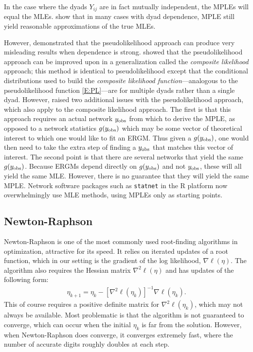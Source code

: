 In the case where the dyads $Y_{ij}$ are in fact mutually independent, the MPLEs will equal the MLEs.  
\citet{Strauss:1990} show that in 
many cases with dyad dependence, MPLE still yield reasonable approximations of the 
true MLEs.  

However, \citet*{Geyer:1992, Snijders:2002, Duijn:2009} demonstrated that 
the pseudolikelihood approach can produce very misleading results 
when dependence is strong.  
\citet*{Composite} showed that the pseudolikelihood approach can be 
improved upon in a generalization 
called the \emph{composite likelihood} approach; this method is identical
to pseudolikelihood except that the conditional distributions used to build the \emph{composite likelihood function}---analogous to the pseudolikelihood function \eqref{E:PL}---are for multiple dyads rather than a single dyad.
However, \citet{Hummel} raised two additional issues with the pseudolikelihood approach, 
which also apply to the composite likelihood approach. 
The first is that this approach requires
an actual network $y_{\text{obs}}$ from which to derive the MPLE, as opposed to a network
statistics $g(y_{\text{obs}})$ which may be some vector of theoretical interest to 
which one would like to fit an ERGM.  Thus given a $g(y_{\text{obs}})$, one would then
need to take the extra step of finding a $y_{\text{obs}}$ that matches this vector of
interest.  The second point is that there are several networks that
yield the same $g(y_{\text{obs}})$.  Because ERGMs depend directly on $g(y_{\text{obs}})$ and not $y_{\text{obs}}$,
these will all yield the same MLE.  However, there is no guarantee that they will yield the same MPLE.
Network software packages such as \texttt{statnet} \citep*{statnet:R} in the R 
platform now overwhelmingly use MLE methods, using MPLEs only as starting points.

\subsection{Newton-Raphson}
Newton-Raphson is one of the most commonly used root-finding algorithms
in optimization, attractive
for its speed.  It relies on iterated updates of a root 
function, which in our setting is the gradient of the log likelihood, $\nabla \ell(\eta)$.  
The algorithm also requires the Hessian matrix $\nabla^2 \ell(\eta)$ and has updates 
of the following form:
\begin{align}
	\eta_{k+1} = \eta_k - \left[ \nabla^2 \ell(\eta_k) \right ]^{-1} \nabla \ell(\eta_k).
\end{align}
This of course requires a positive definite matrix for $\nabla^2 \ell(\eta_k)$, which
may not always be available.  Most problematic is that the algorithm is not guaranteed to 
converge, which can occur when the initial $\eta_k$ is far from the solution.  However,
when Newton-Raphson does converge, it converges extremely fast, 
where the number of accurate digits roughly doubles at each step.

